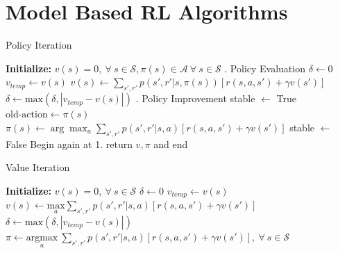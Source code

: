 \documentclass{article}
\newcommand{\mc}{\mathcal}
\begin{document}
\section{Model Based RL Algorithms}\label{sec:model_appendix}
\begin{algorithm}[H]
\caption{Policy Iteration}
\begin{spacing}{0.8}
\begin{algorithmic}[1]
\State \textbf{Initialize:} $v(s) = 0, \ \forall \ s \in \mc{S}, \pi(s) \in \mc{A} \ \forall \ s \in \mc{S}$
. Policy Evaluation
\State $\delta \gets 0$ 
\For{$s \in \mc{S}$}
\State $v_{temp} \gets v(s)$
\State $v(s) \gets \sum_{s', r'}p(s', r'|s,\pi(s))[r(s,a,s') + \gamma v(s')]$
\State $\delta \gets \text{max}(\delta, |v_{temp} - v(s)|)$
\EndFor
\If{$\delta < \epsilon$}
\State {}
\EndIf
\EndWhile
\newline
{}. Policy Improvement
\State stable $\gets$ True
\For{$s \in \mc{S}$}
\State $\text{old-action} \gets \pi(s)$
\State $\pi(s) \gets \arg \max_a \sum_{s',r'} p(s', r'|s,a)[r(s,a,s') + \gamma v(s')]$
\State stable $\gets$ False
\Else
\State Begin again at 1.
\EndIf
\EndFor
{}
\State return $v, \pi$ and end
\EndIf
\EndProcedure
\end{algorithmic}
\end{spacing}
\end{algorithm}


\begin{algorithm}[H]
\caption{Value Iteration}
\begin{spacing}{0.8}
\begin{algorithmic}[1]
\State \textbf{Initialize:} $v(s) = 0, \ \forall \ s \in \mc{S}$
\State $\delta \gets 0$ 
\For{$s \in \mc{S}$}
\State $v_{temp} \gets v(s)$
\State $v(s) \gets \underset{a}{\text{max}} \sum_{s', r'}p(s',r'|s,a)[r(s,a,s') + \gamma v(s')]$
\State $\delta \gets \text{max}(\delta, |v_{temp} - v(s)|)$
\EndFor
\If{$\delta < \epsilon$}
\State {}
\EndIf
\EndWhile
\State $\pi \gets \underset{a}{\text{argmax}} \ \sum_{s',r'} p(s',r'|s,a)[r(s,a,s') + \gamma v(s')], \ \forall \ s \in \mc{S}$
\EndProcedure
\end{algorithmic}
\end{spacing}
\end{algorithm}
\end{document}
